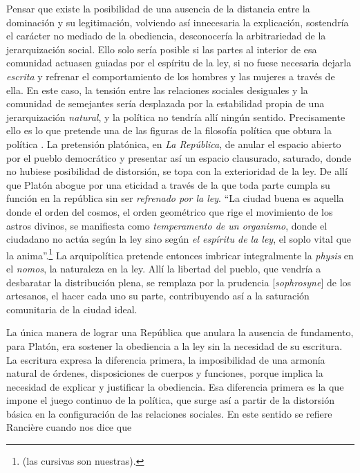 Pensar que existe la posibilidad de una ausencia de la distancia entre la dominación y su legitimación, volviendo así innecesaria la explicación, sostendría el carácter no mediado de la obediencia, desconocería la arbitrariedad de la jerarquización social. Ello solo sería posible si las partes al interior de esa comunidad actuasen guiadas por el espíritu de la ley, si no fuese necesaria dejarla \emph{escrita} y refrenar el comportamiento de los hombres y las mujeres a través de ella. En este caso, la tensión entre las relaciones sociales desiguales y la comunidad de semejantes sería desplazada por la estabilidad propia de una jerarquización \emph{natural}, y la política no tendría allí ningún sentido. Precisamente ello es lo que pretende una de las figuras de la filosofía política que obtura la política . La pretensión platónica, en \emph{La República}, de anular el espacio abierto por el pueblo democrático y presentar así un espacio clausurado, saturado, donde no hubiese posibilidad de distorsión, se topa con la exterioridad de la ley. De allí que Platón abogue por una eticidad a través de la que toda parte cumpla su función en la república sin ser \emph{refrenado por la ley}. \enquote{La ciudad buena es aquella donde el orden del cosmos, el orden geométrico que rige el movimiento de los astros divinos, se manifiesta como \emph{temperamento de un organismo}, donde el ciudadano no actúa según la ley sino según \emph{el espíritu de la ley}, el soplo vital que la anima}.\footnote{\cite[][91]{@7064-RANCIERE2010} (las cursivas son nuestras).} La arquipolítica pretende entonces imbricar integralmente la \emph{physis} en el \emph{nomos}, la naturaleza en la ley. Allí la libertad del pueblo, que vendría a desbaratar la distribución plena, se remplaza por la prudencia {[}\emph{sophrosyne}{]} de los artesanos, el hacer cada uno su parte, contribuyendo así a la saturación comunitaria de la ciudad ideal.

La única manera de lograr una República que anulara la ausencia de fundamento, para Platón, era sostener la obediencia a la ley sin la necesidad de su escritura. La escritura expresa la diferencia primera, la imposibilidad de una armonía natural de órdenes, disposiciones de cuerpos y funciones, porque implica la necesidad de explicar y justificar la obediencia. Esa diferencia primera es la que impone el juego continuo de la política, que surge así a partir de la distorsión básica en la configuración de las relaciones sociales. En este sentido se refiere Rancière cuando nos dice que

